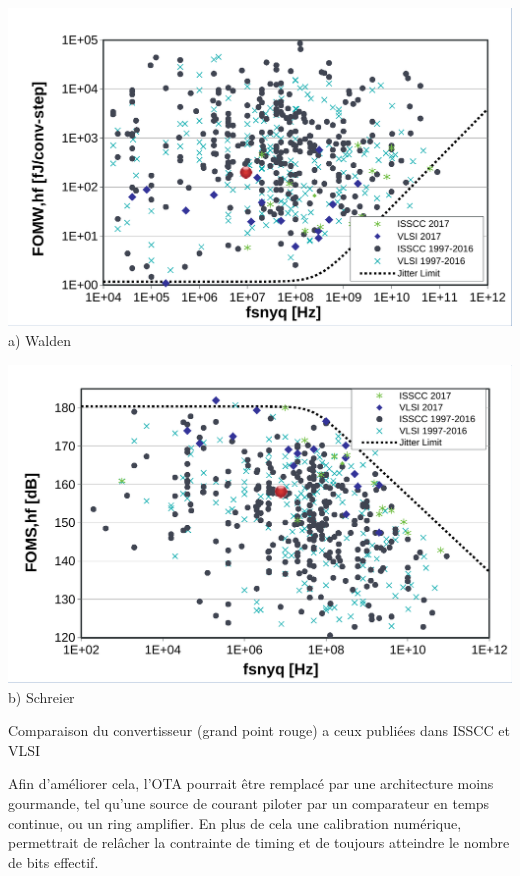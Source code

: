 \begin{mdframed}[linecolor=Prune,linewidth=1]
\begin{center}
    \centering
    \begin{minipage}[b]{0.49\linewidth}
        \centering
        \includegraphics[width=\textwidth]{Abstract/Figs/WaldenFoM-a.pdf}
        a) Walden
    \end{minipage}
    \begin{minipage}[b]{0.49\linewidth}
        \centering
        \includegraphics[width=\textwidth]{Abstract/Figs/SchreierFoM-a.pdf}
        b) Schreier
    \end{minipage}
    \caption[]{Comparaison du convertisseur (grand point rouge) a ceux publiées dans ISSCC et VLSI}
	\label{fig:fom-fr}
\end{center}

Afin d'améliorer cela, l'OTA pourrait être remplacé par une architecture moins gourmande, tel qu'une source de courant piloter par un comparateur en temps continue, ou un ring amplifier. En plus de cela une calibration numérique, permettrait de relâcher la contrainte de timing et de toujours atteindre le nombre de bits effectif.

\end{mdframed}

